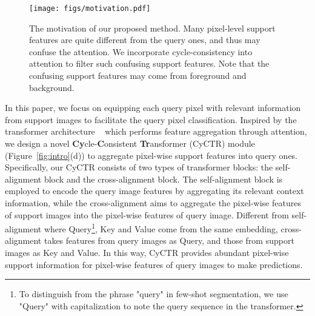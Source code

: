 \documentclass{article}
\begin{document}
\begin{wrapfigure}{r}{0.5\textwidth}
    \centering
    \vspace{-4mm}
    \texttt{[image: figs/motivation.pdf]}
    \caption{The motivation of our proposed method. Many pixel-level support features are quite different from the query ones, and thus may confuse the attention. We incorporate cycle-consistency into attention to filter such confusing support features. 
    Note that the confusing support features may come from foreground and background.}
    \label{fig:motivation}
    \vspace{-2mm}
\end{wrapfigure}

In this paper, we focus on equipping each query pixel with relevant information from support images to facilitate the query pixel classification.
Inspired by the transformer architecture ~\cite{vaswani2017transformer} which performs feature aggregation through attention,
we design a novel \textbf{Cy}cle-\textbf{C}onsistent \textbf{Tr}ansformer (CyCTR) module (Figure~\ref{fig:intro}(d)) to aggregate pixel-wise support features into query ones. 
Specifically, our CyCTR consists of two types of transformer blocks: the self-alignment block and the cross-alignment block. The self-alignment block is employed to encode the query image features by aggregating its relevant context information, while the cross-alignment aims to aggregate the pixel-wise features of support images into the pixel-wise features of query image. Different from self-alignment where Query\footnote{To distinguish from the phrase "query" in few-shot segmentation, we use "Query" with capitalization to note the query sequence in the transformer.}, Key and Value come from the same embedding, cross-alignment takes features from query images as Query, and those from support images as Key and Value.
In this way, CyCTR provides abundant pixel-wise support information for pixel-wise features of query images to make predictions.
\end{document}
